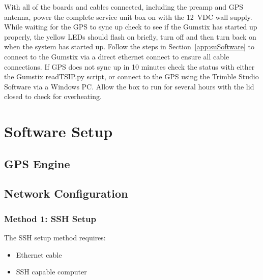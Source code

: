 With all of the boards and cables connected, including the preamp and GPS antenna, power the complete service unit box on with the 12~VDC wall supply.
While waiting for the GPS to sync up check to see if the Gumstix has started up properly, the yellow LEDs should flash on briefly, turn off and then turn back on when the system has started up.
Follow the steps in Section~\ref{app:suSoftware} to connect to the Gumstix via a direct ethernet connect to ensure all cable connections.
If GPS does not sync up in 10 minutes check the status with either the Gumstix readTSIP.py script, or connect to the GPS using the Trimble Studio Software via a Windows PC.
Allow the box to run for several hours with the lid closed to check for overheating.

\section{Software Setup}

\subsection{GPS Engine}

\subsection{Network Configuration}

\subsubsection{Method 1: SSH Setup}
The SSH setup method requires:
\begin{itemize}
\item{Ethernet cable}
\item{SSH capable computer}
\end{itemize}

